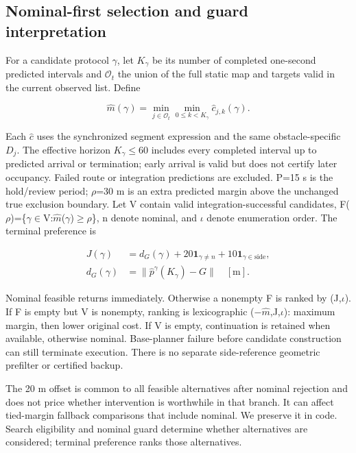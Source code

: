 \documentclass[conference]{IEEEtran}
\begin{document}
\subsection{Nominal-first selection and guard interpretation}

For a candidate protocol \ensuremath{\gamma}, let $K_\gamma$ be its number of completed one-second predicted intervals and $\mathcal O_t$ the union of the full static map and targets valid in the current observed list. Define

\begin{equation}\label{eq:3}
\hat m(\gamma)=\min_{j\in\mathcal O_t}\min_{0\le k<K_\gamma}\hat c_{j,k}(\gamma).
\end{equation}

Each $\hat c$ uses the synchronized segment expression and the same obstacle-specific $D_j$. The effective horizon $K_\gamma$\ensuremath{\le}60 includes every completed interval up to predicted arrival or termination; early arrival is valid but does not certify later occupancy. Failed route or integration predictions are excluded. P=15 s is the hold/review period; \ensuremath{\rho}=30 m is an extra predicted margin above the unchanged true exclusion boundary. Let V contain valid integration-successful candidates, F(\ensuremath{\rho})=\{\ensuremath{\gamma}\ensuremath{\in}V:$\hat m$(\ensuremath{\gamma})\ensuremath{\ge}\ensuremath{\rho}\}, n denote nominal, and \ensuremath{\iota} denote enumeration order. The terminal preference is

\begin{equation}\label{eq:4}
\begin{aligned}J(\gamma)&=d_G(\gamma)+20\mathbf{1}_{\gamma\ne n}+10\mathbf{1}_{\gamma\in\mathrm{side}},\\d_G(\gamma)&=\|\hat p^\gamma(K_\gamma)-G\|\quad[\mathrm m].\end{aligned}
\end{equation}

Nominal feasible returns immediately. Otherwise a nonempty F is ranked by (J,\ensuremath{\iota}). If F is empty but V is nonempty, ranking is lexicographic (\ensuremath{-}$\hat m$,J,\ensuremath{\iota}): maximum margin, then lower original cost. If V is empty, continuation is retained when available, otherwise nominal. Base-planner failure before candidate construction can still terminate execution. There is no separate side-reference geometric prefilter or certified backup.

The 20 m offset is common to all feasible alternatives after nominal rejection and does not price whether intervention is worthwhile in that branch. It can affect tied-margin fallback comparisons that include nominal. We preserve it in code. Search eligibility and nominal guard determine whether alternatives are considered; terminal preference ranks those alternatives.
\end{document}
